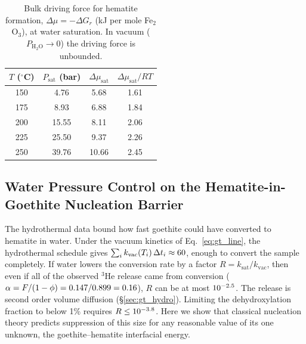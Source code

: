 \begin{table}[htbp]
  \centering
  \caption{Bulk driving force for hematite formation, $\Delta\mu = -\Delta G_r$ (kJ per mole Fe$_2$O$_3$), at water saturation. In vacuum ($P_{\mathrm{H_2O}}\rightarrow0$) the driving force is unbounded.}
  \label{tab:gt_dmu}
  \begin{tabular}{cccc}
    \hline
    $T$ ($^\circ$C) & $P_{\mathrm{sat}}$ (bar) & $\Delta\mu_{\mathrm{sat}}$ & $\Delta\mu_{\mathrm{sat}}/RT$ \\
    \hline
    150 & 4.76  & 5.68  & 1.61 \\
    175 & 8.93  & 6.88  & 1.84 \\
    200 & 15.55 & 8.11  & 2.06 \\
    225 & 25.50 & 9.37  & 2.26 \\
    250 & 39.76 & 10.66 & 2.45 \\
    \hline
  \end{tabular}
\end{table}

\subsection{Water Pressure Control on the Hematite-in-Goethite Nucleation Barrier}\label{sec:gt_nucleation}

The hydrothermal data bound how fast goethite could have converted to hematite in water. Under
the vacuum kinetics of Eq.~\eqref{eq:gt_line}, the hydrothermal schedule gives
$\sum_i k_{\mathrm{vac}}(T_i)\,\Delta t_i \approx 60$, enough to convert the sample
completely. If water lowers the conversion rate by a factor $R = k_{\mathrm{sat}}/k_{\mathrm{vac}}$,
then even if all of the observed $^3$He release came from conversion
($\alpha = F/(1-\phi) = 0.147/0.899 = 0.16$), $R$ can be at most
$10^{-2.5}$. The release is second order volume diffusion (\S\ref{sec:gt_hydro}). Limiting 
the dehydroxylation fraction to below 1\% requires $R \le 10^{-3.8}$. Here we show that classical nucleation
theory predicts suppression of this size for any reasonable value of its one unknown, the
goethite--hematite interfacial energy.

